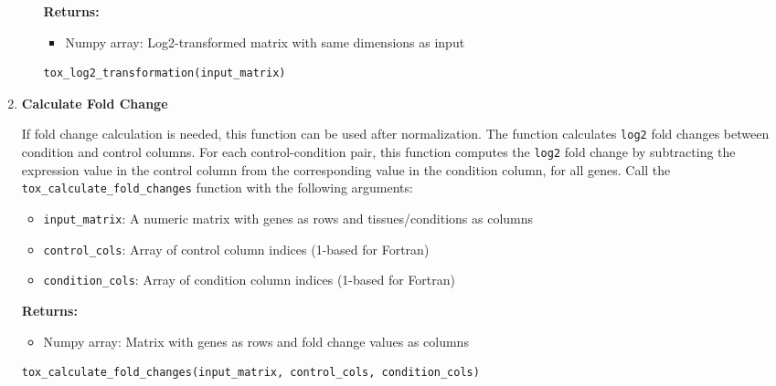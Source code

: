 \documentclass[11pt]{article}
\begin{document}
\begin{enumerate}
\begin{enumerate}
	      	      \textbf{Returns:}
	      	      \begin{itemize}
	      	      	\item Numpy array: Log2-transformed matrix with same dimensions as
	      	      	      input
	      	      \end{itemize}
	      	      \begin{lstlisting}[language=Python, caption={Python Log2 Transformation}]
tox_log2_transformation(input_matrix)
	      	      \end{lstlisting}
	      \end{enumerate}
	      
	\item \textbf{Calculate Fold Change}
	      
	      If fold change calculation is needed, this function can be used after
	      normalization. The function calculates \texttt{log2} fold changes between
	      condition and control columns. For each control-condition pair, this
	      function computes the \texttt{log2} fold change by subtracting the expression
	      value in the control column from the corresponding value in the condition column,
	      for all genes. Call the \texttt{tox\_calculate\_fold\_changes} function
	      with the following arguments:
	      
	      \begin{itemize}
	      	\item \texttt{input\_matrix}: A numeric matrix with genes as rows and tissues/conditions
	      	      as columns
	      	      
	      	\item \texttt{control\_cols}: Array of control column indices (1-based
	      	      for Fortran)
	      	      
	      	\item \texttt{condition\_cols}: Array of condition column indices (1-based
	      	      for Fortran)
	      \end{itemize}
	      
	      \textbf{Returns:}
	      \begin{itemize}
	      	\item Numpy array: Matrix with genes as rows and fold change values as
	      	      columns
	      \end{itemize}
	      
	      \begin{lstlisting}[language=Python, caption={Python Fold Change Calculation}]
tox_calculate_fold_changes(input_matrix, control_cols, condition_cols)
	      \end{lstlisting}
\end{enumerate}
\end{document}

